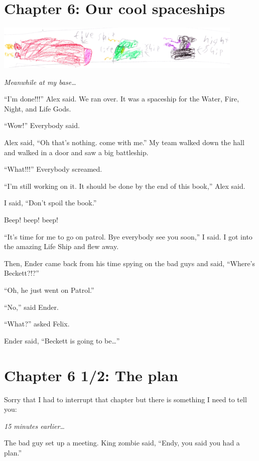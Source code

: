 \documentclass[12pt,oneside]{krantz}
\begin{document}
\hypertarget{chapter-6-our-cool-spaceships}{%
\chapter*{Chapter 6: Our cool
spaceships}\label{chapter-6-our-cool-spaceships}}


\includegraphics[width=4.6875in,height=\textheight]{img/four-bad-guys/threeships.jpg}

\emph{Meanwhile at my base\ldots{}}

``I'm done!!!'' Alex said. We ran over. It was a spaceship for the
Water, Fire, Night, and Life Gods.

``Wow!'' Everybody said.

Alex said, ``Oh that's nothing. come with me.'' My team walked down the
hall and walked in a door and saw a big battleship.

``What!!!'' Everybody screamed.

``I'm still working on it. It should be done by the end of this book,''
Alex said.

I said, ``Don't spoil the book.''

Beep! beep! beep!

``It's time for me to go on patrol. Bye everybody see you soon,'' I
said. I got into the amazing Life Ship and flew away.

Then, Ender came back from his time spying on the bad guys and said,
``Where's Beckett?!?''

``Oh, he just went on Patrol.''

``No,'' said Ender.

``What?'' asked Felix.

Ender said, ``Beckett is going to be\ldots{}''

\hypertarget{chapter-6-12-the-plan}{%
\chapter*{Chapter 6 1/2: The plan}\label{chapter-6-12-the-plan}}


Sorry that I had to interrupt that chapter but there is something I need
to tell you:

\emph{15 minutes earlier\ldots{}}

The bad guy set up a meeting. King zombie said, ``Endy, you said you had
a plan.''
\end{document}
